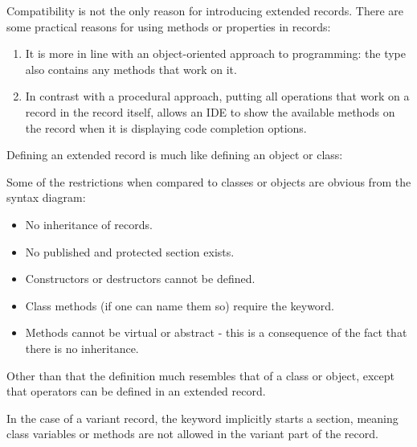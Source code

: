 Compatibility is not the only reason for introducing extended records. 
There are some practical reasons for using methods or properties in records: 
\begin{enumerate}
\item It is more in line with an object-oriented approach to programming:
the type also contains any methods that work on it.
\item In contrast with a procedural approach, putting all operations that
work on a record in the record itself, allows an IDE to show the available
methods on the record when it is displaying code completion options.
\end{enumerate}

Defining an extended record is much like defining an object or class:

Some of the restrictions when compared to classes or objects are 
obvious from the syntax diagram:
\begin{itemize}
\item No inheritance of records.
\item No published and protected section exists. 
\item Constructors or destructors cannot be defined.
\item Class methods (if one can name them so) require the  keyword.
\item Methods cannot be virtual or abstract - this is a consequence
of the fact that there is no inheritance.
\end{itemize}
Other than that the definition much resembles that of a class or object, 
except that operators can be defined in an extended record.

\begin{remark}
In the case of a variant record, the  keyword implicitly starts a
 section, meaning class variables or methods are not allowed in the
variant part of the record.
\end{remark}


